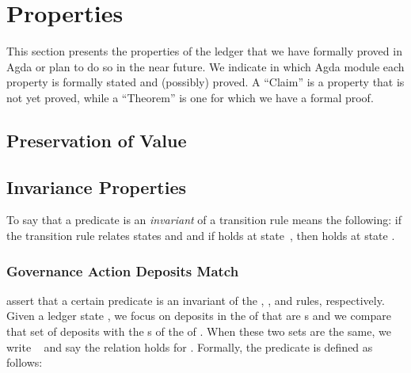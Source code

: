 \documentclass[11pt,a4paper,dvipsnames]{article}
\begin{document}
\tableofcontents



\section{Properties}
This section presents the properties of the ledger that we have formally proved in
Agda or plan to do so in the near future.  We indicate in which Agda module each
property is formally stated and (possibly) proved. A ``Claim'' is a property that is
not yet proved, while a ``Theorem'' is one for which we have a formal proof.

\subsection{Preservation of Value}

\subsection{Invariance Properties}
To say that a predicate  is an \textit{invariant} of a transition rule
means the following: if the transition rule relates states  and  and if
 holds at state~, then  holds at state .


\subsubsection{Governance Action Deposits Match}
 assert that
a certain predicate is an invariant of the \CHAIN{}, \LEDGER{}, and \EPOCH{} rules, respectively.
Given a ledger state , we focus on deposits in the
\UTxOState{} of  that are \GovActionDeposit{}s and we compare that set of
deposits with the \GovActionDeposit{}s of the \GovState{} of .
When these two sets are the same, we write ~ and say
the  relation holds for .
Formally, the  predicate is defined as follows:
\end{document}
